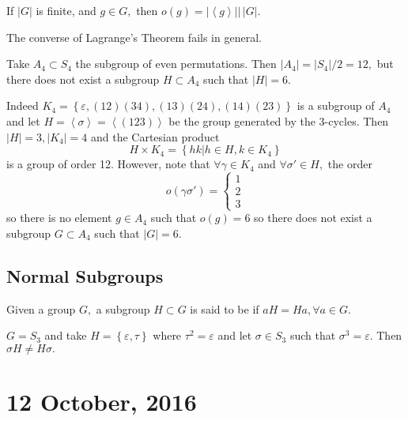 \documentclass{article}
\begin{document}
\begin{corollary}
	If $|G|$ is finite, and $g\in G,$ then $o(g)=\left\lvert \left< g\right> \right\rvert\big \vert\, |G|.$
\end{corollary}

\begin{remark}
	The converse of Lagrange's Theorem fails in general. 
\end{remark}

\begin{example}
	Take $A_4\subset S_4$ the subgroup of even permutations. Then $|A_4|=|S_4|/2=12,$ but there does not exist a subgroup $H\subset A_4$ such that $|H|=6.$

	Indeed $K_4=\left\{ \varepsilon, (12)(34), (13)(24), (14)(23) \right\}$ is a subgroup of $A_4$ and let $H=\left< \sigma\right>=\left< (123)\right>$ be the group generated by the 3-cycles. Then $|H|=3, |K_4|=4$ and the Cartesian product \[H\times K_4=\left\{ hk|h\in H, k\in K_4 \right\}\] is a group of order 12. However, note that $\forall \gamma\in K_4$ and $\forall \sigma'\in H,$ the order \[o(\gamma\sigma')=\begin{cases}
			1 \\ 2 \\ 3
	\end{cases}\] so there is no element $g\in A_4$ such that $o(g)=6$ so there does not exist a subgroup $G\subset A_4$ such that $|G|=6.$
\end{example} 

\subsection{Normal Subgroups}
\begin{definition}
	Given a group $G,$ a subgroup $H\subset G$ is said to be  if $aH=Ha, \forall a\in G.$
\end{definition}

\begin{example}
	$G=S_3$ and take $H=\left\{ \varepsilon, \tau \right\}$ where $\tau^2=\varepsilon$ and let $\sigma\in S_3$ such that $\sigma^3=\varepsilon.$ Then $\sigma H\neq H\sigma.$
\end{example}




\newpage

\section{12 October, 2016}
\end{document}
